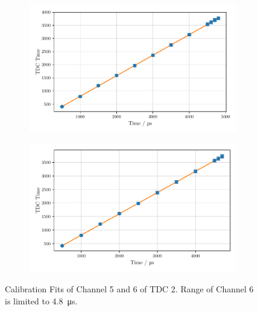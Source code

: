 \begin{figure}
    \centering
    \begin{subfigure}[b]{0.48\textwidth}
        \includegraphics[width=\textwidth]{plots/tdc12.pdf}
    \end{subfigure}\hfill
    \begin{subfigure}[b]{0.48\textwidth}
        \includegraphics[width=\textwidth]{plots/tdc13.pdf}
    \end{subfigure}
    \caption{Calibration Fits of Channel 5 and 6 of TDC 2. 
    Range of Channel 6 is limited to \SI{4.8}{\micro\second}.}
    \label{fig:tdc1213}
\end{figure}
